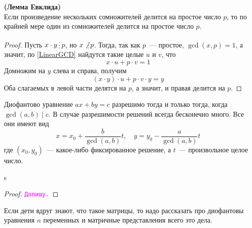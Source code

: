 \documentclass[11pt]{article}
\begin{document}
	\begin{lemma} \textbf{(Лемма Евклида)}\\
		Если произведение нескольких сомножителей делится на простое число $p$, то по крайней мере один из сомножителей делится
		на простое число $p$.
	\end{lemma}
	\begin{proof}
	    Пусть $x \cdot y \divisible p$, но $x \not\divisible p$. Тогда, так как $p$~--- простое, $\gcd(x, p) = 1$, а значит, по
		\ref{LinearGCD} найдутся такие целые $u$ и $v$, что
		\[ x \cdot u + p \cdot v = 1 \]
		Домножим на $y$ слева и справа, получим
		\[ (x \cdot y) \cdot u + p \cdot v \cdot y = y \]
		Оба слагаемых в левой части делятся на $p$, а значит, и правая делится на $p$.
	\end{proof}
	\begin{theorem}
		Диофантово уравнение $ax + by = c$ разрешимо тогда и только тогда, когда $\gcd(a, b) \mid c$. В случае разрешимости
		решений всегда бесконечно много. Все они имеют вид
		\[ x = x_0 + \frac{b}{\gcd(a, b)}t, \quad y = y_0 - \frac{a}{\gcd(a, b)}t \]
		где $(x_0, y_0)$~--- какое-либо фиксированное решение, а $t$~--- произвольное целое число.
	\end{theorem}s
	\begin{proof}
	    \textcolor{magenta}{\texttt{Допишу.}}
	\end{proof}
	\begin{remark}
	    Если дети вдруг знают, что такое матрицы, то надо рассказать про диофантовы уравнения $n$ переменных и матричные представления всего это дела.
	\end{remark}
\end{document}

